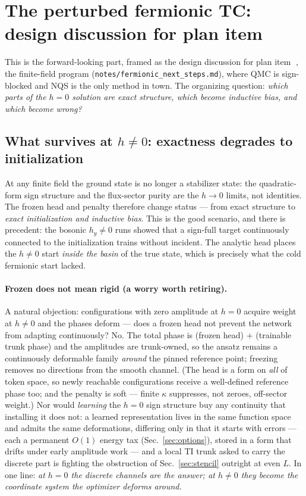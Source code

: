 \documentclass[11pt]{article}
\newcommand{\file}[1]{\texttt{#1}}
\newcommand{\circled}[1]{\textcircled{\raisebox{-0.5pt}{\scriptsize #1}}}
\begin{document}
\section{The perturbed fermionic TC: design discussion for plan item
\texorpdfstring{\circled{3}}{(3)}}
\label{sec:finitefield}

This is the forward-looking part, framed as the design discussion for plan
item \circled{3}, the finite-field program
(\file{notes/fermionic\_next\_steps.md}), where QMC is sign-blocked and NQS
is the only method in town. The organizing
question: \emph{which parts of the $h=0$ solution are exact structure, which
become inductive bias, and which become wrong?}

\subsection{What survives at $h\neq0$: exactness degrades to initialization}
At any finite field the ground state is no longer a stabilizer state: the
quadratic-form sign structure and the flux-sector purity are the $h\to0$
limits, not identities. The frozen head and penalty therefore change status
--- from exact structure to \emph{exact initialization and inductive bias}.
This is the good scenario, and there is precedent: the bosonic $h_y\neq0$
runs \cite{SignNote} showed that a sign-full target continuously connected to
the initialization trains without incident. The analytic head places the
$h\neq0$ start \emph{inside the basin} of the true state, which is precisely
what the cold fermionic start lacked.

\paragraph{Frozen does not mean rigid (a worry worth retiring).}
A natural objection: configurations with zero amplitude at $h=0$ acquire
weight at $h\neq0$ and the phases deform --- does a frozen head not prevent
the network from adapting continuously? No. The total phase is (frozen head)
$+$ (trainable trunk phase) and the amplitudes are trunk-owned, so the
ansatz remains a continuously deformable family \emph{around} the pinned
reference point; freezing removes no directions from the smooth channel.
(The head is a form on \emph{all} of token space, so newly reachable
configurations receive a well-defined reference phase too; and the penalty
is soft --- finite $\kappa$ suppresses, not zeroes, off-sector weight.) Nor
would \emph{learning} the $h=0$ sign structure buy any continuity that
installing it does not: a learned representation lives in the same function
space and admits the same deformations, differing only in that it starts
with errors --- each a permanent $O(1)$ energy tax
(Sec.~\ref{sec:options}), stored in a form that drifts under early amplitude
work --- and a local TI trunk asked to carry the discrete part is fighting
the obstruction of Sec.~\ref{sec:stencil} outright at even $L$. In one
line: \emph{at $h=0$ the discrete channels are the answer; at $h\neq0$ they
become the coordinate system the optimizer deforms around.}
\end{document}
